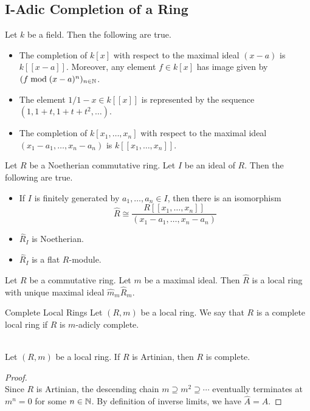 \documentclass[a4paper]{article}
\begin{document}
\subsection{I-Adic Completion of a Ring}
\begin{eg}{}{} Let $k$ be a field. Then the following are true. 
\begin{itemize}
\item The completion of $k[x]$ with respect to the maximal ideal $(x-a)$ is $k[[x-a]]$. Moreover, any element $f\in k[x]$ has image given by $(f\bmod (x-a)^n)_{n\in\mathbb{N}}$. 
\item The element $1/1-x\in k[[x]]$ is represented by the sequence $(1,1+t,1+t+t^2,\dots)$. 
\item The completion of $k[x_1,\dots,x_n]$ with respect to the maximal ideal $(x_1-a_1,\dots,x_n-a_n)$ is $k[[x_1,\dots,x_n]]$. 
\end{itemize}
\end{eg}

\begin{prp}{}{} Let $R$ be a Noetherian commutative ring. Let $I$ be an ideal of $R$. Then the following are true. 
\begin{itemize}
\item If $I$ is finitely generated by $a_1,\dots,a_n\in I$, then there is an isomorphism $$\widehat{R}\cong\frac{R[[x_1,\dots,x_n]]}{(x_1-a_1,\dots,x_n-a_n)}$$
\item $\widehat{R}_I$ is Noetherian. 
\item $\widehat{R}_I$ is a flat $R$-module. 
\end{itemize}
\end{prp}

\begin{prp}{}{} Let $R$ be a commutative ring. Let $m$ be a maximal ideal. Then $\widehat{R}$ is a local ring with unique maximal ideal $\widehat{m}_m\widehat{R}_m$. 
\end{prp}

\begin{defn}{Complete Local Rings}{} Let $(R,m)$ be a local ring. We say that $R$ is a complete local ring if $R$ is $m$-adicly complete. 
\end{defn}

\begin{lmm}{}{}\\
Let $(R,m)$ be a local ring. If $R$ is Artinian, then $R$ is complete. 
\begin{proof}\\
Since $R$ is Artinian, the descending chain $m\supseteq m^2\supseteq\cdots$ eventually terminates at $m^n=0$ for some $n\in\mathbb{N}$. By definition of inverse limits, we have $\widehat{A}=A$. 
\end{proof}
\end{lmm}
\end{document}
